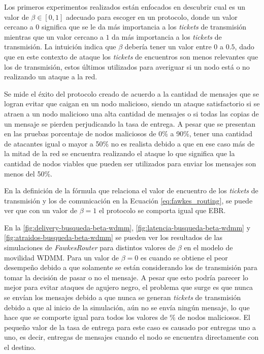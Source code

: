 Los primeros experimentos realizados están enfocados en descubrir cual es un valor de $\beta
\in [0, 1]$ adecuado para escoger en un protocolo, donde un valor cercano a $0$
significa que se le da más importancia a los \textit{tickets} de transmisión
mientras que un valor cercano a $1$ da más importancia a los \textit{tickets} de
transmisión. La intuición indica que $\beta$ debería tener un valor entre $0$ a
$0.5$, dado que en este contexto de ataque los \textit{tickets} de encuentros
son menos relevantes que los de transmisión, estos últimos utilizados para
averiguar si un nodo está o no realizando un ataque a la red. 

Se mide el éxito del protocolo creado de acuerdo a la cantidad de mensajes que
se logran evitar que caigan en un nodo malicioso, siendo un ataque satisfactorio
si se atraen a un nodo malicioso una alta cantidad de mensajes o si todas las
copias de un mensaje se pierden perjudicando la tasa de entrega. A pesar que se
presentan en las pruebas porcentaje de nodos maliciosos de 0\% a 90\%, tener una
cantidad de atacantes igual o mayor a 50\% no es realista debido a que en ese
caso más de la mitad de la red se encuentra realizando el ataque lo que
significa que la cantidad de nodos viables que pueden ser utilizados para enviar
los mensajes son menos del 50\%.

En la definición de la fórmula que relaciona el valor de encuentro de los
\textit{tickets} de transmisión y los de comunicación en la Ecuación
\ref{eq:fawkes_routing}, se puede ver que con un valor de $\beta = 1$ el
protocolo se comporta igual que EBR.

En la \ref{fig:delivery-busqueda-beta-wdmm},
\ref{fig:latencia-busqueda-beta-wdmm} y \ref{fig:atraidos-busqueda-beta-wdmm} se
pueden ver los resultados de las simulaciones de \textit{FawkesRouter} para
distintos valores de $\beta$ en el modelo de movilidad WDMM. Para un valor de
$\beta = 0$ es cuando se obtiene el peor desempeño debido a que solamente se
están considerando los \tickets{} de transmisión para tomar la decisión de pasar
o no el mensaje. A pesar que esto podría parecer lo mejor para evitar ataques de
agujero negro, el problema que surge es que nunca se envían los mensajes debido
a que nunca se generan \textit{tickets} de transmisión debido a que al inicio de
la simulación, aún no se envía ningún mensaje, lo que hace que se comporte igual
para todos los valores de \% de nodos maliciosos. El pequeño valor de la tasa de
entrega para este caso es causado por entregas uno a uno, es decir, entregas de
mensajes cuando el nodo se encuentra directamente con el destino.

